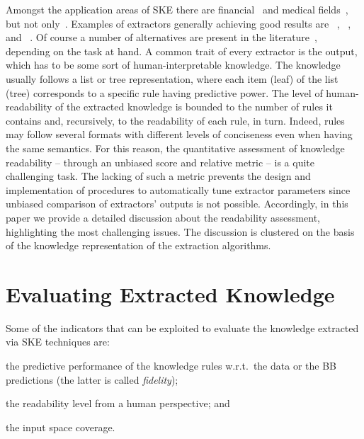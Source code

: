 \documentclass[sigconf]{acmart}
\begin{document}
Amongst the application areas of SKE there are financial~\cite{baesens2001building,baesens2003using,steiner2006using} and medical fields~\cite{bologna1997three,franco2007early,hayashi2000comparison}, but not only~\cite{setiono2011rule,sabbatini22LPFSKE,azcarraga2012keyword,hofmann2003rule}.
%
Examples of extractors generally achieving good results are \cart{}~\cite{breiman1984classification}, \trepan{}~\cite{craven1996extracting}, \gridex{}~\cite{gridex-extraamas2021} and \gridrex{}~\cite{gridrex-kr2022}.
%
Of course a number of alternatives are present in the literature~\cite{craven1994using,huysmans2006iter,barakat2005eclectic,martens2007comprehensible}, depending on the task at hand.
%
A common trait of every extractor is the output, which has to be some sort of human-interpretable knowledge.
%
The knowledge usually follows a list or tree representation, where each item (leaf) of the list (tree) corresponds to a specific rule having predictive power.
%
The level of human-readability of the extracted knowledge is bounded to the number of rules it contains and, recursively, to the readability of each rule, in turn.
%
Indeed, rules may follow several formats with different levels of conciseness even when having the same semantics.
%
For this reason, the quantitative assessment of knowledge readability -- through an unbiased score and relative metric -- is a quite challenging task.
%
The lacking of such a metric prevents the design and implementation of procedures to automatically tune extractor parameters since unbiased comparison of extractors' outputs is not possible.
%
Accordingly, in this paper we provide a detailed discussion about the readability assessment, highlighting the most challenging issues. The discussion is clustered on the basis of the knowledge representation of the extraction algorithms.

\section{Evaluating Extracted Knowledge}

Some of the indicators that can be exploited to evaluate the knowledge extracted via SKE techniques are:
%
\begin{inlinelist}
	\item the predictive performance of the knowledge rules w.r.t.\ the data or the BB predictions (the latter is called \emph{fidelity});
	\item the readability level from a human perspective; and
	\item the input space coverage.
\end{inlinelist}
\end{document}
